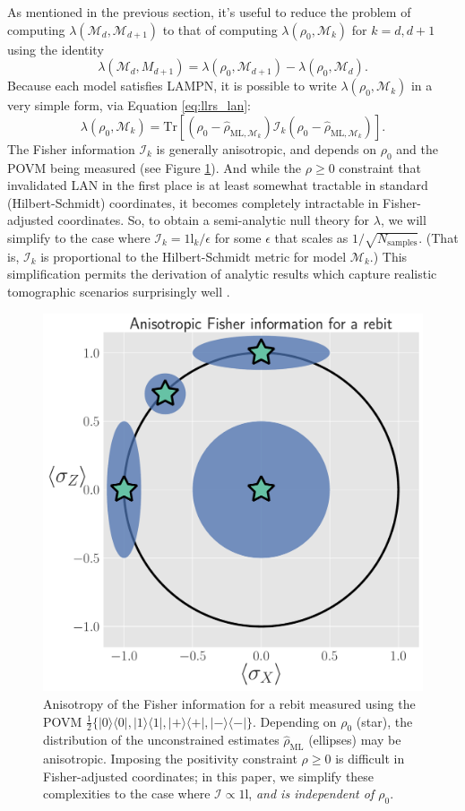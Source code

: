 \documentclass[aps,pra, twocolumn]{revtex4-1}
\newcommand{\M}{\mathcal{M}}
\newcommand{\Id}{\mathbb{I}}
\def\Id{1\!\mathrm{l}}
\newcommand{\rhohat}{\hat{\rho}}
\newcommand{\rhoML}[1]{\rhohat_{\scriptscriptstyle{\mathrm{ML},#1}}}
\begin{document}
As mentioned in the previous section, it's useful to reduce the problem of computing $\lambda(\M_{d}, \M_{d+1})$ to that of computing $\lambda(\rho_{0}, \M_{k})$ for $k = d, d+1$ using the identity
\[\lambda(\M_{d}, M_{d+1}) = \lambda(\rho_{0}, \M_{d+1}) - \lambda(\rho_{0}, \M_{d}).\]
Because each model satisfies LAMPN, it is possible to write $\lambda(\rho_{0}, \M_{k})$ in a very simple form, via Equation \eqref{eq:llrs_lan}:
\[\lambda(\rho_{0}, \M_{k}) = \mathrm{Tr}[(\rho_{0} - \rhoML{\M_{k}})\mathcal{I}_{k}(\rho_{0} - \rhoML{\M_{k}})].\]
The Fisher information $\mathcal{I}_{k}$ is generally anisotropic, and depends on $\rho_{0}$ and the POVM being measured (see Figure \ref{fig:anisofi}). And while the $\rho\geq0$ constraint  that invalidated LAN in the first place is at least somewhat tractable in standard (Hilbert-Schmidt) coordinates, it becomes completely intractable in Fisher-adjusted coordinates.  So, to obtain a semi-analytic null theory for $\lambda$, we will simplify to the case where   $\mathcal{I}_{k} = \Id_{k}/\epsilon $ for some $\epsilon$ that scales as $1/\sqrt{N_{\mathrm{samples}}}$. (That is, $\mathcal{I}_{k}$ is proportional to the Hilbert-Schmidt metric for model $\M_{k}$.) This simplification permits the derivation of analytic results which capture realistic tomographic scenarios surprisingly well \cite{Smolin2012}.
\begin{figure}
\includegraphics[width=.85\columnwidth]{Images/Figure_2.pdf}
 \caption{Anisotropy of the Fisher information for a rebit measured using the POVM $\frac{1}{2}\{|0\rangle\langle 0|, |1\rangle\langle 1|, |+\rangle\langle +|, |-\rangle\langle -|\}$. Depending on $\rho_{0}$ (star), the distribution of the unconstrained estimates $\hat{\rho}_{\mathrm{ML}}$ (ellipses) may be anisotropic. Imposing the positivity constraint $\rho \geq 0$ is difficult in Fisher-adjusted coordinates; in this paper, we simplify these complexities to the case where $\mathcal{I} \propto \Id$, \emph{and is independent of $\rho_{0}$}.}
\label{fig:anisofi}
\end{figure}
\end{document}
